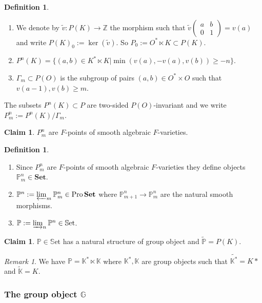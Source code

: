\documentclass[11pt,a4paper,twoside]{amsart}
\theoremstyle{definition}
\newtheorem{definition}[theorem]{Definition}
\newtheorem{claim}[theorem]{Claim}
\theoremstyle{remark}
\newtheorem{remark}[theorem]{Remark}
\newcommand{\mG}{\mathbb G}
\newcommand{\mK}{\mathbb K}
\newcommand{\mP}{\mathbb P}
\newcommand{\mZ}{\mathbb Z}
\newcommand{\GG}{\Gamma}
\newcommand{\ti}{\widetilde}
\newcommand{\wt}{\widetilde}
\newcommand{\prl}{\varprojlim}
\newcommand{\inl}{\varinjlim}
\newcommand{\Pro}{\operatorname{Pro}}
\newcommand{\bSet}{\mathbf{Set}}
\newcommand{\mSet}{\mathbb{S}\mathrm{et}}
\begin{document}
\begin{definition}\label{P_0}

 \begin{enumerate}

\item
We denote by $\ti v:P(K) \to \mZ$ the
morphism such that $\ti v \begin{pmatrix}a&b\\0&1 \end{pmatrix}= v(a)$
and write $P(K)_0:=\ker(\ti v)$.
So $P_0:= O^* \ltimes K \subset P(K)$.
\item $  P ^n(K)=\{(a,b)\in K^* \ltimes K | \min(v(a),-v(a),v(b))\geq -n\}$.

\item
$\GG _m \subset P(O) $  is the subgroup  of pairs  $(a,b)\in O^\ast \times O$ such
that $v(a-1),v(b)\geq m$. \end{enumerate} \end{definition}
The subsets $P ^n(K)\subset  P$ are two-sided $P(O)$-invariant and we write  $ P ^n _m := P^n (K)/ \GG_m $.
\begin{claim} $P ^n _m$ are
$F$-points of smooth algebraic $F$-varieties.
\end{claim}
\begin{definition}

 \begin{enumerate}
\item Since $P^n_m$ are
$F$-points of smooth algebraic $F$-varieties they define objects $\mP ^n _m \in  \bSet$.

\item  $\mP ^n := \prl _m \mP ^n_m \in \Pro \textbf{Set}$ where $ \mP ^n _{m+1} \to \mP ^n _m $ are the natural  smooth morphisms.
\item    $\mP := \inl _n \mP ^n\in \mSet$.
\end{enumerate} \end{definition}
\begin{claim}
$ \mP \in \mSet $ has a natural structure of group
object and   $\wt {\mP}= P(K)$.
\end{claim}

\begin{remark} We have $\mP = \mK ^\ast \ltimes \mK$ where 
$\mK ^\ast ,\mK $ are group objects such that  $\wt {\mK^\ast}= K\ast$ and  $\wt {\mK}= K$.
\end{remark}

\subsubsection{The group object
$ \mG$}
\end{document}
